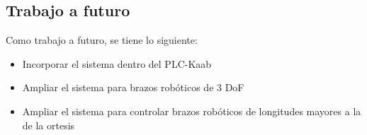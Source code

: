 \subsection{Trabajo a futuro}

Como trabajo a futuro, se tiene lo siguiente:

\begin{itemize}
	\item Incorporar el sistema dentro del PLC-Kaab
	\item Ampliar el sistema para brazos robóticos de 3 DoF
	\item Ampliar el sistema para controlar brazos robóticos de longitudes mayores a la de la ortesis
\end{itemize}
